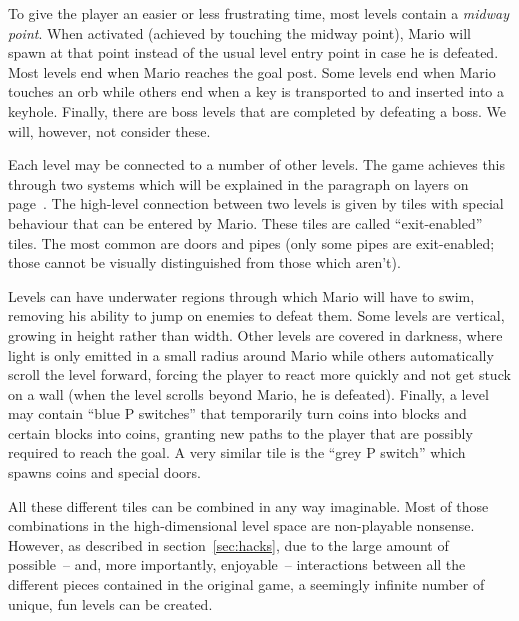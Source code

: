 To give the player an easier or less frustrating time, most levels
contain a \emph{midway point}. When activated (achieved by touching
the midway point), Mario will spawn at that point instead of the usual
level entry point in case he is defeated. Most levels end when Mario
reaches the goal post. Some levels end when Mario touches an orb while
others end when a key is transported to and inserted into a keyhole.
Finally, there are boss levels that are completed by defeating a boss.
We will, however, not consider these.

Each level may be connected to a number of other levels. The game
achieves this through two systems which will be explained in the
paragraph on layers on page~\pageref{par:layers}. The high-level
connection between two levels is given by tiles with special behaviour
that can be entered by Mario. These tiles are called ``exit-enabled''
tiles. The most common are doors and pipes (only some pipes are
exit-enabled; those cannot be visually distinguished from those which
aren't).

Levels can have underwater regions through which Mario will have to
swim, removing his ability to jump on enemies to defeat them. Some
levels are vertical, growing in height rather than width. Other levels
are covered in darkness, where light is only emitted in a small radius
around Mario while others automatically scroll the level forward,
forcing the player to react more quickly and not get stuck on a wall
(when the level scrolls beyond Mario, he is defeated). Finally, a
level may contain ``blue P switches'' that temporarily turn coins into
blocks and certain blocks into coins, granting new paths to the player
that are possibly required to reach the goal. A very similar tile is
the ``grey P switch'' which spawns coins and special doors.

All these different tiles can be combined in any way imaginable. Most
of those combinations in the high-dimensional level space are
non-playable nonsense. However, as described in
section~\ref{sec:hacks}, due to the large amount of possible~-- and,
more importantly, enjoyable~-- interactions between all the different
pieces contained in the original game, a seemingly infinite number of
unique, fun levels can be created.
\medskip

